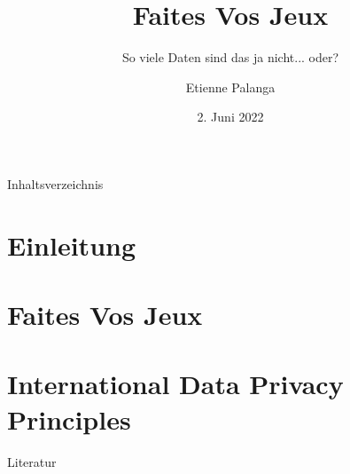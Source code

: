 \documentclass[aspectratio=169,10pt, notes]{beamer}
\title{Faites Vos Jeux}
\subtitle{So viele Daten sind das ja nicht... oder?}
\author{Etienne Palanga}
\date{2. Juni 2022}
\institute{TU Dortmund - Fakultät Informatik}
\begin{document}
\maketitle

\begin{frame}{Inhaltsverzeichnis}
    \tableofcontents
\end{frame}


\section{Einleitung}



\section{Faites Vos Jeux \cite{kees_faites_2017}}










\section{International Data Privacy Principles \cite{zankl_international_2014}}



\nocite{mifune}

\begin{frame}{Literatur}
\printbibliography[heading=none]
\end{frame}
\end{document}
